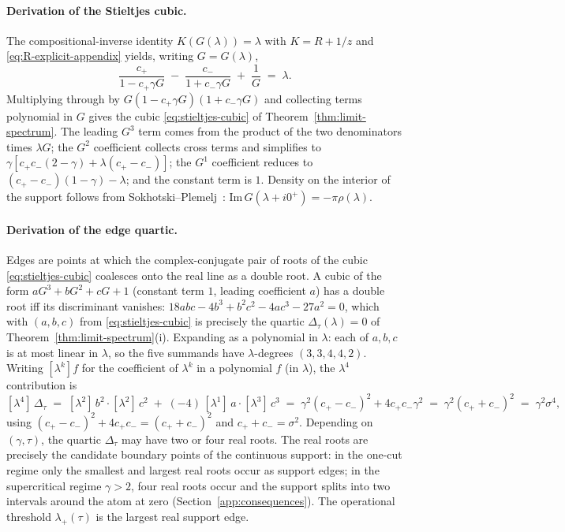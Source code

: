 \documentclass{article}
\begin{document}
\paragraph{Derivation of the Stieltjes cubic.}
The compositional-inverse identity $K(G(\lambda)) = \lambda$ with
$K = R + 1/z$ and \eqref{eq:R-explicit-appendix} yields, writing $G = G(\lambda)$,
\[
\frac{c_+}{1 - c_+\gamma G} \;-\; \frac{c_-}{1 + c_-\gamma G} \;+\; \frac{1}{G} \;=\; \lambda.
\]
Multiplying through by $G(1 - c_+\gamma G)(1 + c_-\gamma G)$ and
collecting terms polynomial in $G$ gives the cubic
\eqref{eq:stieltjes-cubic} of Theorem~\ref{thm:limit-spectrum}.
The leading $G^3$ term comes from the product of the two denominators
times $\lambda G$; the $G^2$ coefficient collects cross terms and
simplifies to $\gamma[c_+c_-(2-\gamma) + \lambda(c_+ - c_-)]$; the $G^1$
coefficient reduces to $(c_+ - c_-)(1-\gamma) - \lambda$; and the
constant term is $1$. Density on the interior of the support follows
from Sokhotski--Plemelj~\cite{bai2010}: $\mathrm{Im}\,G(\lambda + i0^+) = -\pi\rho(\lambda)$.

\paragraph{Derivation of the edge quartic.}
Edges are points at which the complex-conjugate pair of roots of the
cubic \eqref{eq:stieltjes-cubic} coalesces onto the real line as a
double root. A cubic of the form $a G^3 + b G^2 + c G + 1$ (constant term $1$, leading coefficient $a$) has a double root iff its discriminant vanishes:
$18abc - 4b^3 + b^2 c^2 - 4ac^3 - 27a^2 = 0$, which with $(a,b,c)$
from \eqref{eq:stieltjes-cubic} is precisely the quartic
$\Delta_\tau(\lambda) = 0$ of Theorem~\ref{thm:limit-spectrum}(i).
Expanding as a polynomial in $\lambda$: each of $a, b, c$ is at most
linear in $\lambda$, so the five summands have $\lambda$-degrees
$(3, 3, 4, 4, 2)$. Writing $[\lambda^k] f$ for the coefficient of
$\lambda^k$ in a polynomial $f$ (in $\lambda$), the $\lambda^4$
contribution is
\[
[\lambda^4]\,\Delta_\tau \;=\; [\lambda^2]\,b^2 \cdot [\lambda^2]\,c^2 \;+\; (-4)\,[\lambda^1]\,a \cdot [\lambda^3]\,c^3 \;=\; \gamma^2(c_+\!-\!c_-)^2 + 4 c_+c_-\gamma^2 \;=\; \gamma^2(c_++c_-)^2 \;=\; \gamma^2\sigma^4,
\]
using $(c_+-c_-)^2 + 4 c_+c_- = (c_++c_-)^2$ and $c_++c_- = \sigma^2$.
Depending on $(\gamma, \tau)$, the quartic $\Delta_\tau$ may have two or four real roots. The real roots are precisely the candidate boundary points of the continuous support: in the one-cut regime only the smallest and largest real roots occur as support edges; in the supercritical regime $\gamma > 2$, four real roots occur and the support splits into two intervals around the atom at zero (Section~\ref{app:consequences}). The operational threshold $\lambda_+(\tau)$ is the largest real support edge.
\end{document}
